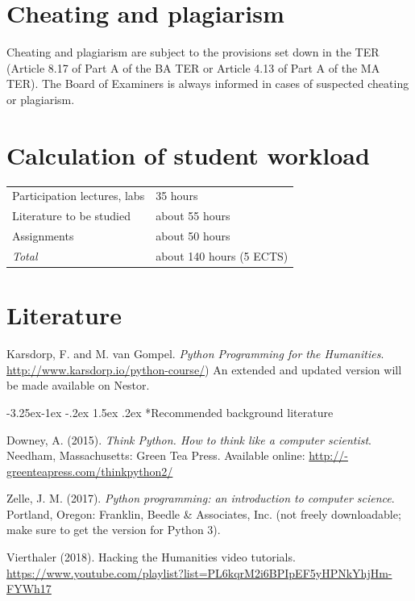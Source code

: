 \documentclass[a4paper,12pt]{article}
\makeatletter
\renewcommand\subsection{\@startsection{subsection}{2}{\z@}%
		{-3.25ex\@plus -1ex \@minus -.2ex}%
		{1.5ex \@plus .2ex}%
		{\normalfont\scshape}}
\makeatother
\begin{document}
\section{Cheating and plagiarism}
Cheating and plagiarism are subject to the provisions set down in the TER
(Article 8.17 of Part A of the BA TER or Article 4.13 of Part A of the MA TER).
The Board of Examiners is always informed in cases of suspected cheating or
plagiarism.

\section{Calculation of student workload}
\begin{tabular}{ll}
    Participation lectures, labs   & 35 hours \\
    Literature to be studied       & about 55 hours \\
    Assignments                    & about 50 hours \\
    \emph{Total}                   & about 140 hours (5 ECTS) \\
\end{tabular}

\section{Literature}
Karsdorp, F. and M. van Gompel. \emph{Python Programming for the Humanities}.
\url{http://www.karsdorp.io/python-course/})
An extended and updated version will be made available on Nestor.


\subsection*{Recommended background literature}

Downey, A. (2015). \emph{Think Python. How to think like a computer scientist}.
Needham, Massachusetts: Green Tea Press.
Available online: \url{http://-greenteapress.com/thinkpython2/}

Zelle, J. M. (2017).
\emph{Python programming: an introduction to computer science}.
Portland, Oregon: Franklin, Beedle \& Associates, Inc.
(not freely downloadable; make sure to get the version for Python 3).

Vierthaler (2018). Hacking the Humanities video tutorials.
\url{https://www.youtube.com/playlist?list=PL6kqrM2i6BPIpEF5yHPNkYhjHm-FYWh17}


\pagebreak
\end{document}
